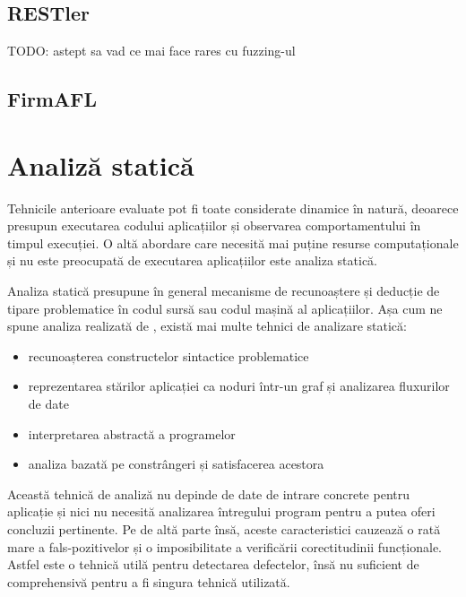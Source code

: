 
\subsection{RESTler}

TODO: astept sa vad ce mai face rares cu fuzzing-ul

\citet{Godefroid2020}



\subsection{FirmAFL}


\section{Analiză statică}

Tehnicile anterioare evaluate pot fi toate considerate dinamice în natură, deoarece presupun executarea codului aplicațiilor și observarea comportamentului în timpul execuției. O altă abordare care necesită mai puține resurse computaționale și nu este preocupată de executarea aplicațiilor este analiza statică. 

Analiza statică presupune în general mecanisme de recunoaștere și deducție de tipare problematice în codul sursă sau codul mașină al aplicațiilor. Așa cum ne spune analiza realizată de \citet{Gosain2015}, există mai multe tehnici de analizare statică:
\begin{itemize}
    \item recunoașterea constructelor sintactice problematice
    \item reprezentarea stărilor aplicației ca noduri într-un graf și analizarea fluxurilor de date
    \item interpretarea abstractă a programelor
    \item analiza bazată pe constrângeri și satisfacerea acestora
\end{itemize}

Această tehnică de analiză nu depinde de date de intrare concrete pentru aplicație și nici nu necesită analizarea întregului program pentru a putea oferi concluzii pertinente. Pe de altă parte însă, aceste caracteristici cauzează o rată mare a fals-pozitivelor și o imposibilitate a verificării corectitudinii funcționale. Astfel este o tehnică utilă pentru detectarea defectelor, însă nu suficient de comprehensivă pentru a fi singura tehnică utilizată.

